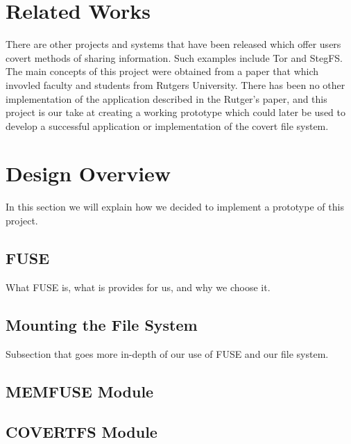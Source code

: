 \documentclass[12pt,journal,compsoc]{IEEEtran}
\begin{document}
\section{Related Works}
There are other projects and systems that have been released which offer users covert methods of sharing information. Such examples include Tor and StegFS\cite{Tan2003}. The main concepts of this project were obtained from a paper that which invovled faculty and students from Rutgers University\cite{Baliga2007}.  There has been no other implementation of the application described in the Rutger's paper, and this project is our take at creating a working prototype which could later be used to develop a successful application or implementation of the covert file system.


\section{Design Overview}

In this section we will explain how we decided to implement a prototype of this project.



\subsection{FUSE}

What FUSE is, what is provides for us, and why we choose it.

\subsection{Mounting the File System}

Subsection that goes more in-depth of our use of FUSE and our file system.

\subsection{MEMFUSE Module}

\subsection{COVERTFS Module}
\end{document}

